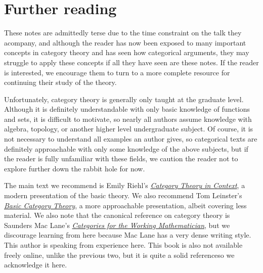 \documentclass[11pt, A4]{article}
\begin{document}
\section{Further reading}

These notes are admittedly terse due to the time constraint on the talk they acompany, and although the reader has now been exposed to many important concepts in category theory and has seen how categorical arguments, they may struggle to apply these concepts if all they have seen are these notes. If the reader is interested, we encourage them to turn to a more complete resource for continuing their study of the theory.

Unfortunately, category theory is generally only taught at the graduate level. Although it is definitely understandable with only basic knowledge of functions and sets, it is difficult to motivate, so nearly all authors assume knowledge with algebra, topology, or another higher level undergraduate subject. Of course, it is not necessary to understand all examples an author gives, so categorical texts are definitely approachable with only some knowledge of the above subjects, but if the reader is fully unfamiliar with these fields, we caution the reader not to explore further down the rabbit hole for now.

The main text we recommend is Emily Riehl's \href{https://emilyriehl.github.io/files/context.pdf}{\emph{Category Theory in Context}}, a modern presentation of the basic theory. We also recommend Tom Leinster's \href{https://arxiv.org/abs/1612.09375}{\emph{Basic Category Theory}}, a more approachable presentation, albeit covering less material. We also note that the canonical reference on category theory is Saunders Mac Lane's \href{https://link.springer.com/book/10.1007/978-1-4757-4721-8}{\emph{Categories for the Working Mathematician}}, but we discourage learning from here because Mac Lane has a very dense writing style. This author is speaking from experience here. This book is also not available freely online, unlike the previous two, but it is quite a solid referenceso we acknowledge it here.
\end{document}
